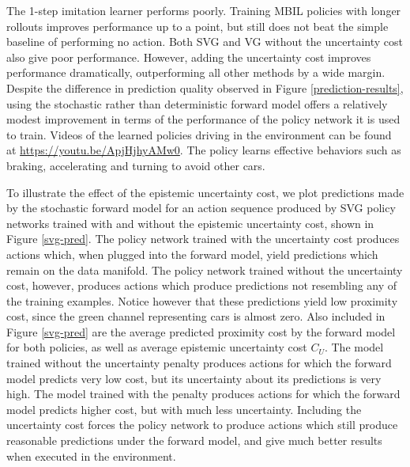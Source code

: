 \documentclass{article} %
\begin{document}
  The 1-step imitation learner performs poorly.
  Training MBIL policies with longer rollouts improves performance up to a point, but still does not beat the simple baseline of performing no action.
  Both SVG and VG without the uncertainty cost also give poor performance.
  However, adding the uncertainty cost improves performance dramatically, outperforming all other methods by a wide margin.
  Despite the difference in prediction quality observed in Figure \ref{prediction-results}, using the stochastic rather than deterministic forward model offers a relatively modest improvement in terms of the performance of the policy network it is used to train.
  Videos of the learned policies driving in the environment can be found at \url{https://youtu.be/ApjHjhyAMw0}.
  The policy learns effective behaviors such as braking, accelerating and turning to avoid other cars.


  To illustrate the effect of the epistemic uncertainty cost, we plot predictions made by the stochastic forward model for an action sequence produced by SVG policy networks trained with and without the epistemic uncertainty cost, shown in Figure \ref{svg-pred}.
  The policy network trained with the uncertainty cost produces actions which, when plugged into the forward model, yield predictions which remain on the data manifold.
  The policy network trained without the uncertainty cost, however, produces actions which produce predictions not resembling any of the training examples.
  Notice however that these predictions yield low proximity cost, since the green channel representing cars is almost zero.
  Also included in Figure \ref{svg-pred} are the average predicted proximity cost by the forward model for both policies, as well as average epistemic uncertainty cost $C_U$.
  The model trained without the uncertainty penalty produces actions for which the forward model predicts very low cost, but its uncertainty about its predictions is very high.
  The model trained with the penalty produces actions for which the forward model predicts higher cost, but with much less uncertainty.
  Including the uncertainty cost forces the policy network to produce actions which still produce reasonable predictions under the forward model, and give much better results when executed in the environment.
\end{document}
